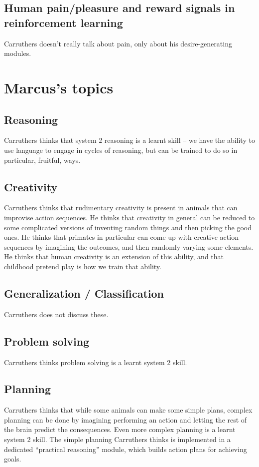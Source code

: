 \documentclass[10pt,a4paper]{article}
\newcommand{\nquote}[1]{``{#1}''}
\begin{document}
\subsection{Human pain/pleasure and reward signals in reinforcement learning}
Carruthers doesn't really talk about pain, only about his desire-generating modules.

\section{Marcus's topics}

\subsection{Reasoning}
Carruthers thinks that system 2 reasoning is a learnt skill -- we have the ability to use language to engage in cycles of reasoning, but can be trained to do so in particular, fruitful, ways.

\subsection{Creativity}
Carruthers thinks that rudimentary creativity is present in animals that can improvise action sequences. He thinks that creativity in general can be reduced to some complicated versions of inventing random things and then picking the good ones. He thinks that primates in particular can come up with creative action sequences by imagining the outcomes, and then randomly varying some elements. He thinks that human creativity is an extension of this ability, and that childhood pretend play is how we train that ability.

\subsection{Generalization / Classification}
Carruthers does not discuss these.

\subsection{Problem solving}
Carruthers thinks problem solving is a learnt system 2 skill.

\subsection{Planning}
Carruthers thinks that while some animals can make some simple plans, complex planning can be done by imagining performing an action and letting the rest of the brain predict the consequences. Even more complex planning is a learnt system 2 skill. The simple planning Carruthers thinks is implemented in a dedicated \nquote{practical reasoning} module, which builds action plans for achieving goals.
\end{document}
